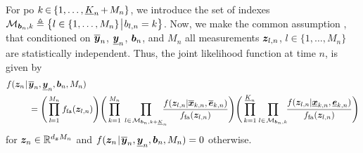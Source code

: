 \documentclass[11pt,a4paper]{article}
\newcommand{\ist}{\hspace*{.3mm}}
\newcommand{\rmv}{\hspace*{-.3mm}}
\newcommand{\nn}{\nonumber}
\begin{document}
For \ac{po} $k \rmv\in\rmv \{1,\dots,\underline{K}_n \rmv+\rmv M_n\}$, we introduce the set of indexes $\Set{M}_{\V{b}_n,k} \triangleq \big\{ l \in \{1,\dots, M_n\} \ist \big| \ist b_{l,n} = k \big\}$. Now, we make the common assumption \cite{MeyKroWilLauHlaBraWin:J18,GraFatSve:J19}, that conditioned on $\overline{\bm{y}}_n$, $\underline{\bm{y}}_n$, $\bm{b}_n$, and $M_n$ all measurements $\bm{z}_{l,n}$, $l \in \{1,\dots,M_n\}$ are statistically independent. Thus, the joint likelihood function at time $n$, is given \vspace{-2mm} by
\begin{align}
&f(\V{z}_n \ist | \ist \overline{\V{y}}_n, \underline{\V{y}}_n, \V{b}_n, M_n) \nn\\
&\hspace{9mm} = \Bigg( \prod^{M_n}_{l \rmv=\rm1} \ist f_{\mathrm{fa}}(\V{z}_{l,n}) \Bigg) \Bigg( \prod^{M_n}_{k = 1} \ist\ist\ist \prod_{l \in \ist \Set{M}_{\V{b}_n,k+\underline{K}_n}} \rmv\rmv\rmv\rmv\rmv\rmv\rmv\rmv\rmv \frac{f(\V{z}_{l,n}| \overline{\V{x}}_{k,n},  \overline{\V{e}}_{k,n})}{f_{\mathrm{fa}}(\V{z}_{l,n})} \Bigg) \Bigg( \prod^{\underline{K}_n}_{k = 1} \ist \prod_{l \in \ist \Set{M}_{\V{b}_n,k}} \!\!\frac{f(\V{z}_{l,n}| \underline{\V{x}}_{k,n}, \underline{\V{e}}_{k,n})}{f_{\mathrm{fa}}(\V{z}_{l,n})}  \Bigg) \label{eq:likelihoodFunction}
\end{align}
for $\bm{z}_n \in \mathbb{R}^{d_{\bm{z}} M_n}$ and $f(\V{z}_n \ist | \ist \overline{\V{y}}_n, \underline{\V{y}}_n, \V{b}_n, M_n) = 0$ otherwise.
\end{document}
